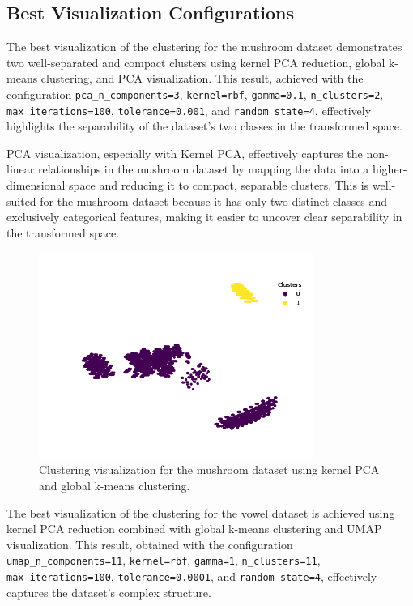\subsection{Best Visualization Configurations}
\label{subsec:best-visualization-configs}

The best visualization of the clustering for the mushroom dataset demonstrates two well-separated and compact clusters using kernel PCA reduction, global k-means clustering, and PCA visualization. This result, achieved with the configuration \texttt{pca\_n\_components=3}, \texttt{kernel=rbf}, \texttt{gamma=0.1}, \texttt{n\_clusters=2}, \texttt{max\_iterations=100}, \texttt{tolerance=0.001}, and \texttt{random\_state=4}, effectively highlights the separability of the dataset's two classes in the transformed space.

PCA visualization, especially with Kernel PCA, effectively captures the non-linear relationships in the mushroom dataset by mapping the data into a higher-dimensional space and reducing it to compact, separable clusters. This is well-suited for the mushroom dataset because it has only two distinct classes and exclusively categorical features, making it easier to uncover clear separability in the transformed space.

\begin{figure}[h!]
    \centering
    \includegraphics[width=0.8\textwidth]{figures/visualizations/pca_n_components=3,kernel=rbf,gamma=0.1,n_clusters=2,max_iterations=100,tolerance=0.001,random_state=4.png}
    \caption{Clustering visualization for the mushroom dataset using kernel PCA and global k-means clustering.}
    \label{fig:mushroom_clustering}
\end{figure}

The best visualization of the clustering for the vowel dataset is achieved using kernel PCA reduction combined with global k-means clustering and UMAP visualization. This result, obtained with the configuration \texttt{umap\_n\_components=11}, \texttt{kernel=rbf}, \texttt{gamma=1}, \texttt{n\_clusters=11}, \texttt{max\_iterations=100}, \texttt{tolerance=0.0001}, and \texttt{random\_state=4}, effectively captures the dataset's complex structure.

